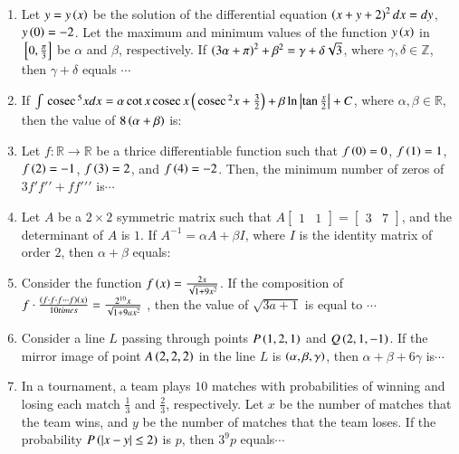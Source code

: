 \documentclass[journal,12pt,twocolumn]{IEEEtran}
\theoremstyle{remark}
\begin{document}
\begin{enumerate}[start=16]
    \item Let $y = y\left(x\right)$ be the solution of the differential equation $\left(x + y + 2\right)^2  dx = dy$, $y\left(0\right) = -2$. Let the maximum and minimum values of the function $y\left(x\right)$ in ${}\left[0, \frac{\pi}{3}\right]$ be $\alpha$ and $\beta$, respectively. If $\left(3\alpha + \pi\right)^2 + \beta^2 = \gamma + \delta\sqrt{3}$, where $\gamma, \delta \in \mathbb{Z}$, then $\gamma + \delta$ equals $\cdots$
    \hfill{}
    \item If $\int \,\text{cosec}\,^5 x dx = \alpha \cot x \,\text{cosec}\, x\left(\,\text{cosec}\,^2 x +\frac{3}{2}\right) + \beta\ln\left\vert \tan \frac{x}{2}\right\vert + C$, where $\alpha, \beta \in \mathbb{R}$, then the value of $8\left(\alpha + \beta\right)$ is:
    \hfill{}

    \item Let $f : \mathbb{R} \to \mathbb{R}$ be a thrice differentiable function such that $f\left(0\right) = 0$, $f\left(1\right) = 1$, $f\left(2\right) = -1$, $f\left(3\right) = 2$, and $f\left(4\right) = -2$. Then, the minimum number of zeros of $3f\prime f\prime\prime+ff\prime\prime\prime$ is$\cdots$
    \hfill{}

    \item Let $A$ be a $2 \times 2$ symmetric matrix such that $A  \begin{bmatrix} 1 & 1 \end{bmatrix}=\begin{bmatrix} 3 & 7     \end{bmatrix}$, and the determinant of $A$ is $1$. If $A^{-1} = \alpha A + \beta I$, where $I$ is the identity matrix of order $2$, then $\alpha + \beta$ equals:
   \hfill{}
	    \item Consider the function $f\left(x\right) = \frac{2x}{\sqrt{1 + 9x^2}}$. If the composition of $f\cdot\frac{\left(f\cdot f \cdot f \cdots f\right)\left(x\right)}{10 times}=\frac{2^{10}x}{\sqrt{1+9ax^2}}$ , then the value of $\sqrt{3a+1}$ is equal to $\cdots$
    \hfill{}

    \item Consider a line $L$ passing through points $P\left(1, 2, 1\right)$ and $Q\left(2, 1, -1\right)$. If the mirror image of point $A\left(2, 2, 2\right)$ in the line $L$ is $\left(\alpha, \beta, \gamma\right)$, then $\alpha + \beta + 6\gamma$ is$\cdots$
    \hfill{}

    \item In a tournament, a team plays $10$ matches with probabilities of winning and losing each match $\frac{1}{3}$ and $\frac{2}{3}$, respectively. Let $x$ be the number of matches that the team wins, and $y$ be the number of matches that the team loses. If the probability $P\left(\left\vert x - y\right\vert \leq 2\right)$ is $p$, then $3^9p$ equals$\cdots$
   \hfill{}


\end{enumerate}
\end{document}
